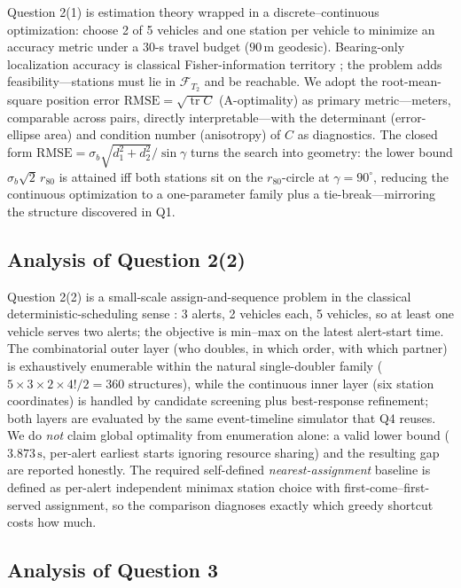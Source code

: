 Question 2(1) is estimation theory wrapped in a discrete--continuous optimization:
choose 2 of 5 vehicles and one station per vehicle to minimize an accuracy metric under
a 30-s travel budget ($90\,\mathrm{m}$ geodesic). Bearing-only localization accuracy is
classical Fisher-information territory \cite{torrieri1984,aidala1979,kay1993}; the
problem adds feasibility---stations must lie in $\mathcal{F}_{T_2}$ and be reachable. We
adopt the root-mean-square position error $\mathrm{RMSE}=\sqrt{\operatorname{tr}C}$
(A-optimality) as primary metric---meters, comparable across pairs, directly
interpretable---with the determinant (error-ellipse area) and condition number
(anisotropy) of $C$ as diagnostics. The closed form
$\mathrm{RMSE}=\sigma_b\sqrt{d_1^2+d_2^2}/\sin\gamma$ turns the search into geometry:
the lower bound $\sigma_b\sqrt2\,r_{80}$ is attained iff both stations sit on the
$r_{80}$-circle at $\gamma=90^\circ$, reducing the continuous optimization to a
one-parameter family plus a tie-break---mirroring the structure discovered in Q1.

\subsection{Analysis of Question 2(2)}

Question 2(2) is a small-scale assign-and-sequence problem in the classical
deterministic-scheduling sense \cite{pinedo2023}: 3 alerts, 2 vehicles each, 5 vehicles,
so at least one vehicle serves two alerts; the objective is min--max on the latest
alert-start time. The combinatorial outer layer (who doubles, in which order, with which
partner) is exhaustively enumerable within the natural single-doubler family
($5\times3\times2\times4!/2=360$ structures), while the continuous inner layer (six
station coordinates) is handled by candidate screening plus best-response refinement;
both layers are evaluated by the same event-timeline simulator that Q4 reuses. We do
\emph{not} claim global optimality from enumeration alone: a valid lower bound
($3.873\,\mathrm{s}$, per-alert earliest starts ignoring resource sharing) and the
resulting gap are reported honestly. The required self-defined
\emph{nearest-assignment} baseline is defined as per-alert independent minimax station
choice with first-come--first-served assignment, so the comparison diagnoses exactly
which greedy shortcut costs how much.

\subsection{Analysis of Question 3}

